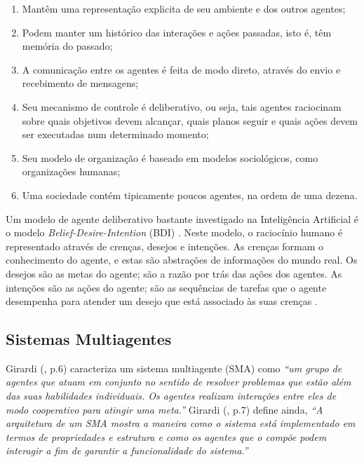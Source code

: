 \begin{description}
\begin{citacao}
\begin{enumerate}
	\item Mantêm uma representação explicita de seu ambiente e dos outros agentes;
	\item Podem manter um histórico das interações e ações passadas, isto é, têm memória do passado;
	\item A comunicação entre os agentes é feita de modo direto, através do envio e recebimento de mensagens;
	\item Seu mecanismo de controle é deliberativo, ou seja, tais agentes raciocinam sobre quais objetivos devem alcançar, quais planos seguir e quais ações devem ser executadas num determinado momento;
	\item Seu modelo de organização é baseado em modelos sociológicos, como organizações humanas;
	\item Uma sociedade contém tipicamente poucos agentes, na ordem de uma dezena.
	 \newline {}

\end{enumerate}
\end{citacao}

Um modelo de agente deliberativo bastante investigado na Inteligência Artificial é o modelo \textit{Belief-Desire-Intention} (BDI) . Neste modelo, o raciocínio humano é representado através de crenças, desejos e intenções. As crenças formam o conhecimento do agente, e estas são abstrações de informações do mundo real. Os desejos são as metas do agente; são a razão por trás das ações dos agentes. As intenções são as ações do agente; são as sequências de tarefas que o agente desempenha para atender um desejo que está associado às suas crenças \cite[p. 31]{serrano2011}.

\end{description}

\subsection{Sistemas Multiagentes}
Girardi (\citeyear{girardi2004}, p.6) caracteriza um sistema multiagente (SMA) como \textit{“um grupo de agentes que atuam em conjunto no sentido de resolver problemas que estão além das suas habilidades individuais. Os agentes realizam interações entre eles de modo cooperativo para atingir uma meta.”} Girardi (\citeyear{girardi2004}, p.7) define ainda, \textit{“A arquitetura  de um SMA mostra a maneira como o sistema está implementado em termos de propriedades e estrutura e como os agentes que o compõe podem interagir a fim de garantir a funcionalidade do sistema.”}

